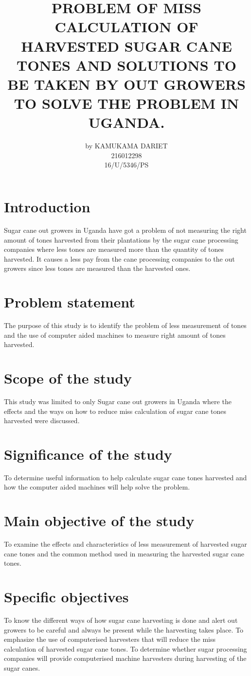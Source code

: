 \documentclass[10pt,letterpaper]{article}
\begin{document}
\title{PROBLEM OF MISS CALCULATION OF HARVESTED SUGAR CANE TONES AND SOLUTIONS TO BE TAKEN BY OUT GROWERS TO SOLVE THE PROBLEM IN UGANDA.}
\author{by KAMUKAMA DARIET  \\ 216012298 \\  16/U/5346/PS}
\maketitle
\section{Introduction }
Sugar cane out growers in Uganda have got a problem of not measuring the right amount of tones harvested from their plantations by the sugar cane processing companies where less tones are measured more than the quantity of tones harvested. 
It causes a less pay from the cane processing companies to the out growers since less tones are measured than the harvested ones.
\section{Problem statement }
The purpose of this study is to identify the problem of less measurement of tones and the use of computer aided machines to measure right amount of tones harvested.
\section{Scope of the study}
This study was limited to only Sugar cane out growers in Uganda where the effects and the ways on how to reduce miss calculation of sugar cane tones harvested were discussed.
\section{Significance of the study}
To determine useful information to help calculate sugar cane tones harvested and how the computer aided machines will help solve the problem.
\section{Main objective of the study}
To examine the effects and characteristics of less measurement of harvested sugar cane tones and the common method used in measuring the harvested sugar cane tones.
\section{Specific objectives}
To know the different ways of how sugar cane harvesting is done and alert out growers to be careful and always be present while the harvesting takes place.
To emphasize the use of computerised harvesters that will reduce the miss calculation of harvested sugar cane tones.
To determine whether sugar processing companies will provide computerised machine harvesters during harvesting of the sugar canes. 
\end{document}

